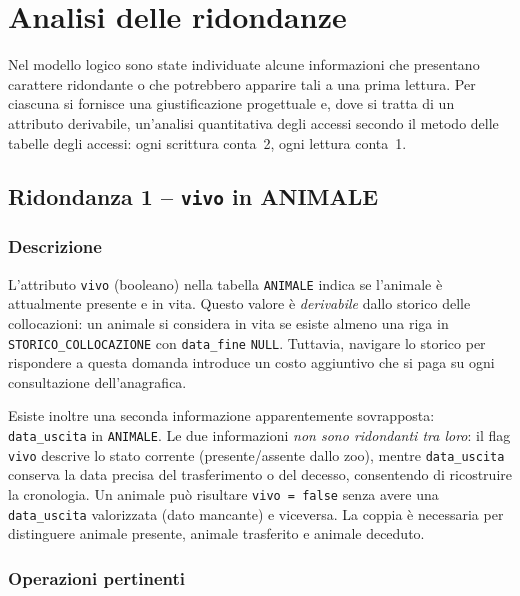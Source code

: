 \documentclass[12pt,a4paper]{report}
\begin{document}
\section{Analisi delle ridondanze}

Nel modello logico sono state individuate alcune informazioni che presentano carattere
ridondante o che potrebbero apparire tali a una prima lettura. Per ciascuna si fornisce
una giustificazione progettuale e, dove si tratta di un attributo derivabile, un'analisi
quantitativa degli accessi secondo il metodo delle tabelle degli accessi: ogni scrittura
conta~2, ogni lettura conta~1.

\subsection*{Ridondanza 1 -- \texttt{vivo} in ANIMALE}

\subsubsection*{Descrizione}

L'attributo \texttt{vivo} (booleano) nella tabella \texttt{ANIMALE} indica se
l'animale è attualmente presente e in vita. Questo valore è \emph{derivabile}
dallo storico delle collocazioni: un animale si considera in vita se esiste almeno
una riga in \texttt{STORICO\_COLLOCAZIONE} con \texttt{data\_fine} \texttt{NULL}.
Tuttavia, navigare lo storico per rispondere a questa domanda introduce un costo
aggiuntivo che si paga su ogni consultazione dell'anagrafica.

Esiste inoltre una seconda informazione apparentemente sovrapposta: \texttt{data\_uscita}
in \texttt{ANIMALE}. Le due informazioni \emph{non sono ridondanti tra loro}: il
flag \texttt{vivo} descrive lo stato corrente (presente/assente dallo zoo),
mentre \texttt{data\_uscita} conserva la data precisa del trasferimento o del
decesso, consentendo di ricostruire la cronologia. Un animale può risultare
\texttt{vivo = false} senza avere una \texttt{data\_uscita} valorizzata (dato mancante)
e viceversa. La coppia è necessaria per distinguere animale presente, animale
trasferito e animale deceduto.

\subsubsection*{Operazioni pertinenti}
\end{document}
